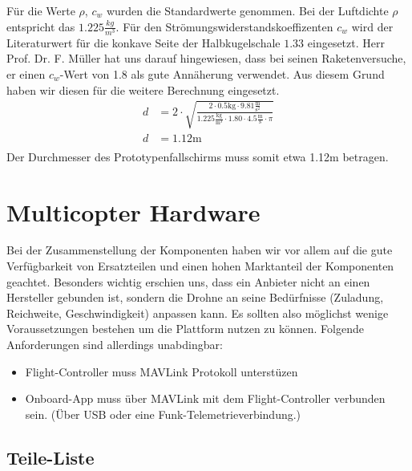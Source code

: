 Für die Werte $\rho$, $c_w$ wurden die Standardwerte genommen. Bei der Luftdichte $\rho$ entspricht das $1.225 \frac{kg}{m^3}$. 
Für den Strömungswiderstandskoeffizenten $c_w$ wird der Literaturwert für die konkave Seite der Halbkugelschale $1.33$ eingesetzt. Herr Prof. Dr. F. Müller hat uns darauf hingewiesen, dass bei seinen Raketenversuche, er einen $c_w$-Wert von 1.8 als gute Annäherung verwendet. Aus diesem Grund haben wir diesen für die weitere Berechnung eingesetzt.
\begin{equation}
\begin{split}
d &= 2 \cdot \sqrt{\frac{2 \cdot 0.5\text{kg} \cdot  9.81\frac{\text{m}}{\text{s}^2}}{1.225 \frac{\text{kg}}{\text{m}^3} \cdot 1.80 \cdot 4.5 \frac{\text{m}}{\text{s}} \cdot \pi}} \\
d &= 1.12\text{m} \\
\end{split}
\end{equation}
Der Durchmesser des Prototypenfallschirms muss somit etwa 1.12m betragen.

\newpage
\section{Multicopter Hardware}

Bei der Zusammenstellung der Komponenten haben wir vor allem auf die gute Verfügbarkeit von 
Ersatzteilen und einen hohen Marktanteil der Komponenten geachtet. Besonders wichtig erschien uns, dass ein Anbieter nicht an einen Hersteller gebunden ist, sondern die Drohne an seine Bedürfnisse (Zuladung, Reichweite, Geschwindigkeit) anpassen kann. Es sollten also möglichst wenige Voraussetzungen bestehen um die Plattform nutzen zu können. Folgende Anforderungen sind allerdings unabdingbar:
\begin{itemize}
	\item Flight-Controller muss \Gls{MAVLink} Protokoll unterstüzen
	\item Onboard-App muss über MAVLink mit dem Flight-Controller verbunden sein. (Über USB oder eine Funk-Telemetrieverbindung.)
\end{itemize}

\subsection{Teile-Liste}

